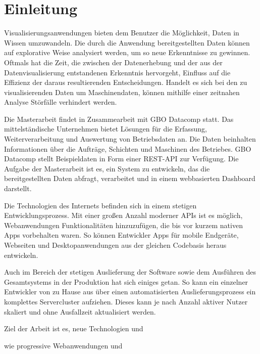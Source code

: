\chapter{Einleitung}
\label{chap:einleitung}
Visualisierungsanwendungen bieten dem Benutzer die Möglichkeit,
Daten in Wissen umzuwandeln. Die durch die Anwendung bereitgestellten
Daten können auf explorative Weise analysiert werden, um so neue
Erkenntnisse zu gewinnen. Oftmals hat die Zeit, die zwischen der 
Datenerhebung und der aus der Datenvisualisierung entstandenen Erkenntnis
hervorgeht, Einfluss auf die Effizienz der daraus resultierenden Entscheidungen.
Handelt es sich bei den zu visualisierenden Daten um Maschinendaten,
können mithilfe einer zeitnahen Analyse Störfälle verhindert werden.

Die Masterarbeit findet in Zusammearbeit mit GBO Datacomp statt.
Das mittelständische Unternehmen bietet Lösungen für die Erfassung,
Weiterverarbeitung und Auswertung von Betriebsdaten an. Die Daten
beinhalten Informationen über die Aufträge, Schichten und Maschinen
des Betriebes. GBO Datacomp stellt Beispieldaten in Form einer REST-API
zur Verfügung. Die Aufgabe der Masterarbeit ist es, ein System zu entwickeln, das die 
bereitgestellten Daten abfragt, verarbeitet und in einem webbasierten Dashboard
darstellt.

Die Technologien des Internets befinden sich in einem stetigen Entwicklungsprozess.
Mit einer großen Anzahl moderner APIs ist es möglich, Webanwendungen Funktionalitäten
hinzuzufügen, die bis vor kurzem nativen Apps vorbehalten waren. So können Entwickler
Apps für mobile Endgeräte, Webseiten und Desktopanwendungen aus der gleichen Codebasis
heraus entwickeln.

Auch im Bereich der stetigen Auslieferung der Software sowie dem Ausführen des Gesamtsystems in der 
Produktion hat sich einiges getan. So kann ein einzelner Entwickler von zu Hause aus über einen automatisierten 
Auslieferungsprozess ein komplettes Servercluster aufziehen. Dieses kann je nach Anzahl aktiver Nutzer skaliert
und ohne Ausfallzeit aktualisiert werden.

Ziel der Arbeit ist es, neue Technologien und 

wie progressive Webanwendungen und 


 







